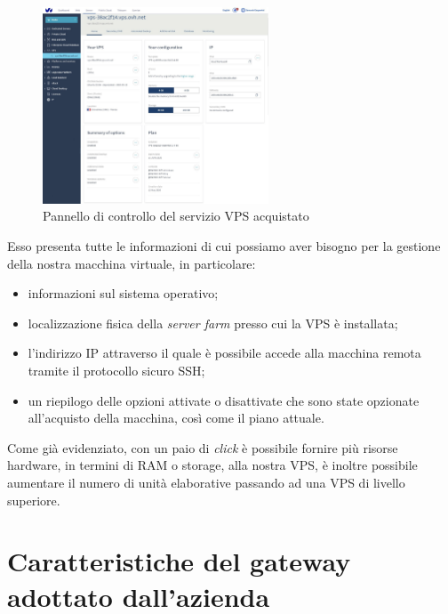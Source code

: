 \begin{figure}[ht]
	\centering
	\includegraphics[width=0.6\textwidth]{immagini/pannello_di_controllo_VPS.jpg}
	\caption{Pannello di controllo del servizio VPS acquistato}
	\label{fig:pannello_di_controllo_vps}
\end{figure}

Esso presenta tutte le informazioni di cui possiamo aver bisogno per la gestione della nostra macchina virtuale, in particolare:
\begin{itemize}
	\item informazioni sul sistema operativo;
	\item localizzazione fisica della \textit{server farm} presso cui la VPS è installata;
	\item l'indirizzo IP attraverso il quale è possibile accede alla macchina remota tramite il protocollo sicuro SSH;
	\item un riepilogo delle opzioni attivate o disattivate che sono state opzionate all’acquisto della macchina, così come il piano attuale.
\end{itemize}
Come già evidenziato, con un paio di \textit{click} è possibile fornire più risorse hardware, in termini di RAM o storage, alla nostra VPS, è inoltre possibile  aumentare il numero di unità elaborative passando ad una VPS di livello superiore.

\section{Caratteristiche del gateway adottato dall'azienda }\label{caratteristiche_gateway}

